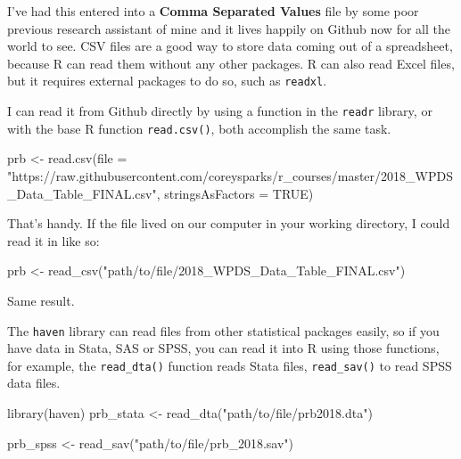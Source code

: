 \documentclass[
]{article}
\newenvironment{Shaded}{\begin{snugshade}}{\end{snugshade}}
\newcommand{\AttributeTok}[1]{\textcolor[rgb]{0.77,0.63,0.00}{#1}}
\newcommand{\ConstantTok}[1]{\textcolor[rgb]{0.00,0.00,0.00}{#1}}
\newcommand{\FunctionTok}[1]{\textcolor[rgb]{0.00,0.00,0.00}{#1}}
\newcommand{\NormalTok}[1]{#1}
\newcommand{\OtherTok}[1]{\textcolor[rgb]{0.56,0.35,0.01}{#1}}
\newcommand{\StringTok}[1]{\textcolor[rgb]{0.31,0.60,0.02}{#1}}
\begin{document}
I've had this entered into a \textbf{Comma Separated Values} file by some
poor previous research assistant of mine and it lives happily on Github
now for all the world to see. CSV files are a good way to store data
coming out of a spreadsheet, because R can read them without any other
packages. R can also read Excel files, but it requires external packages
to do so, such as \texttt{readxl}.

I can read it from Github directly by using a function in the \texttt{readr}
library, or with the base R function \texttt{read.csv()}, both accomplish the
same task.

\begin{Shaded}
\begin{Highlighting}[]
\NormalTok{prb }\OtherTok{\textless{}{-}} \FunctionTok{read.csv}\NormalTok{(}\AttributeTok{file =} \StringTok{"https://raw.githubusercontent.com/coreysparks/r\_courses/master/2018\_WPDS\_Data\_Table\_FINAL.csv"}\NormalTok{,}
    \AttributeTok{stringsAsFactors =} \ConstantTok{TRUE}\NormalTok{)}
\end{Highlighting}
\end{Shaded}

That's handy. If the file lived on our computer in your working
directory, I could read it in like so:

\begin{Shaded}
\begin{Highlighting}[]
\NormalTok{prb }\OtherTok{\textless{}{-}} \FunctionTok{read\_csv}\NormalTok{(}\StringTok{"path/to/file/2018\_WPDS\_Data\_Table\_FINAL.csv"}\NormalTok{)}
\end{Highlighting}
\end{Shaded}

Same result.

The \texttt{haven} library \citet{haven} can read files from other statistical
packages easily, so if you have data in Stata, SAS or SPSS, you can read
it into R using those functions, for example, the \texttt{read\_dta()} function
reads Stata files, \texttt{read\_sav()} to read SPSS data files.

\begin{Shaded}
\begin{Highlighting}[]
\FunctionTok{library}\NormalTok{(haven)}
\NormalTok{prb\_stata }\OtherTok{\textless{}{-}} \FunctionTok{read\_dta}\NormalTok{(}\StringTok{"path/to/file/prb2018.dta"}\NormalTok{)}

\NormalTok{prb\_spss }\OtherTok{\textless{}{-}} \FunctionTok{read\_sav}\NormalTok{(}\StringTok{"path/to/file/prb\_2018.sav"}\NormalTok{)}
\end{Highlighting}
\end{Shaded}
\end{document}
